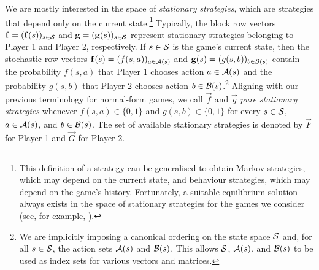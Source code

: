     We are mostly interested in the space of \emph{stationary strategies}, which are strategies that depend only on the current state.\footnote{This
        definition of a strategy can be generalised to obtain Markov strategies, which may depend on the current state, and behaviour strategies, which may depend on the game's history.
        Fortunately, a suitable equilibrium solution always exists in the space of stationary strategies for the games we consider (see, for example, \parencite[Theorem 3.1.1, Theorem 4.6.4]{Filar1997}).
    }
    Typically, the block row vectors $\mathbf{f} = (\mathbf{f}(s))_{s \in \mathcal{S}}$ and $\mathbf{g} = (\mathbf{g}(s))_{s \in \mathcal{S}}$ represent stationary strategies belonging to Player 1 and Player 2, respectively.
    If $s \in \mathcal{S}$ is the game's current state, then the stochastic row vectors $\mathbf{f}(s) = (f(s, a))_{a \in \mathcal{A}(s)}$ and $\mathbf{g}(s) = (g(s, b))_{b \in \mathcal{B}(s)}$ contain the probability $f(s, a)$ that Player 1 chooses action $a \in \mathcal{A}(s)$ and the probability $g(s, b)$ that Player 2 chooses action $b \in \mathcal{B}(s)$.\footnote{
        We are implicitly imposing a canonical ordering on the state space $\mathcal{S}$ and, for all $s \in \mathcal{S}$, the action sets $\mathcal{A}(s)$ and $\mathcal{B}(s)$.
        This allows $\mathcal{S}$, $\mathcal{A}(s)$, and $\mathcal{B}(s)$ to be used as index sets for various vectors and matrices.
    }
    Aligning with our previous terminology for normal-form games, we call $\vec{f}$ and $\vec{g}$ \emph{pure stationary strategies} whenever $f(s, a) \in \{0, 1\}$ and $g(s, b) \in \{0, 1\}$ for every $s \in \mathcal{S}$, $a \in \mathcal{A}(s)$, and $b \in \mathcal{B}(s)$.
    The set of available stationary strategies is denoted by $\vec{F}$ for Player 1 and $\vec{G}$ for Player 2.

